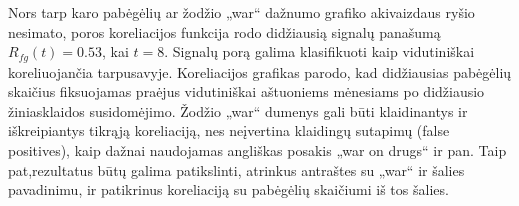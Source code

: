 Nors tarp karo pabėgėlių ar žodžio „war“ dažnumo grafiko akivaizdaus ryšio nesimato,
poros koreliacijos funkcija rodo didžiausią signalų panašumą \( R_{fg}(t) = 0.53 \), kai \( t = 8 \).
Signalų porą galima klasifikuoti kaip vidutiniškai koreliuojančia tarpusavyje.
Koreliacijos grafikas parodo, kad didžiausias pabėgėlių skaičius fiksuojamas praėjus vidutiniškai aštuoniems mėnesiams po didžiausio žiniasklaidos susidomėjimo.
Žodžio „war“ dumenys gali būti klaidinantys ir iškreipiantys tikrąją koreliaciją, nes neįvertina klaidingų sutapimų (false positives), kaip dažnai naudojamas angliškas posakis „war on drugs“ ir pan.
Taip pat,rezultatus būtų galima patikslinti, atrinkus antraštes su „war“ ir šalies pavadinimu, ir patikrinus koreliaciją su pabėgėlių skaičiumi iš tos šalies.
